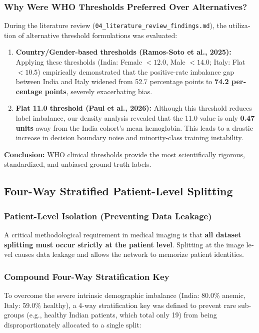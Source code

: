 \documentclass{article}
\begin{document}
\begin{latin}
		\subsubsection{Why Were WHO Thresholds Preferred Over Alternatives?}
		During the literature review (\texttt{04\_literature\_review\_findings.md}), the utilization of alternative threshold formulations was evaluated:
		\begin{enumerate}
			\item \textbf{Country/Gender-based thresholds (Ramos-Soto et al., 2025):} Applying these thresholds (India: Female $<12.0$, Male $<14.0$; Italy: Flat $<10.5$) empirically demonstrated that the positive-rate imbalance gap between India and Italy widened from 52.7 percentage points to \textbf{74.2 percentage points}, severely exacerbating bias.
			\item \textbf{Flat 11.0 threshold (Paul et al., 2026):} Although this threshold reduces label imbalance, our density analysis revealed that the 11.0 value is only \textbf{0.47 units} away from the India cohort's mean hemoglobin. This leads to a drastic increase in decision boundary noise and minority-class training instability.
		\end{enumerate}
		\textbf{Conclusion:} WHO clinical thresholds provide the most scientifically rigorous, standardized, and unbiased ground-truth labels.
		
		\subsection{Four-Way Stratified Patient-Level Splitting}
		
		\subsubsection{Patient-Level Isolation (Preventing Data Leakage)}
		A critical methodological requirement in medical imaging is that \textbf{all dataset splitting must occur strictly at the patient level}. Splitting at the image level causes data leakage and allows the network to memorize patient identities.
		
		\subsubsection{Compound Four-Way Stratification Key}
		To overcome the severe intrinsic demographic imbalance (India: 80.0\% anemic, Italy: 59.0\% healthy), a 4-way stratification key was defined to prevent rare subgroups (e.g., healthy Indian patients, which total only 19) from being disproportionately allocated to a single split:
		

\end{latin}
\end{document}
